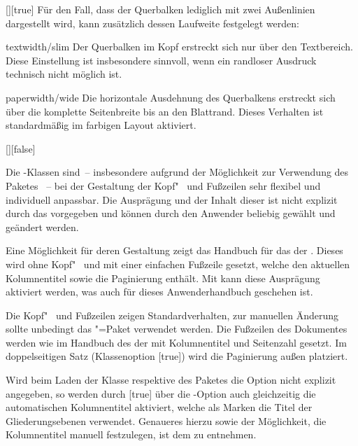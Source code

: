 \begin{Declaration*}{}
\begin{Declaration*}{}
\begin{Declaration*}{}
\begin{Declaration}{[\PSet]}[true]
%
Für den Fall, dass der Querbalken lediglich mit zwei Außenlinien dargestellt 
wird, kann zusätzlich dessen Laufweite festgelegt werden:
%
\begin{values}
\item[textwidth/slim]
  Der Querbalken im Kopf erstreckt sich nur über den Textbereich. Diese 
  Einstellung ist insbesondere sinnvoll, wenn ein randloser Ausdruck technisch 
  nicht möglich ist.   
\item[paperwidth/wide]
  Die horizontale Ausdehnung des Querbalkens erstreckt sich über die komplette 
  Seitenbreite bis an den Blattrand. Dieses Verhalten ist standardmäßig im 
  farbigen Layout aktiviert.
\end{values}
\end{Declaration}

\begin{Declaration}{[\PSet]}[false]%
\printdeclarationlist%
%
%
%

Die \TUDScript-Klassen sind~-- insbesondere aufgrund der Möglichkeit zur 
Verwendung des Paketes ~-- bei der Gestaltung der 
Kopf"~ und Fußzeilen sehr flexibel und individuell anpassbar. Die Ausprägung 
und der Inhalt dieser ist nicht explizit durch das \CD vorgegeben und können 
durch den Anwender beliebig gewählt und geändert werden. 

Eine Möglichkeit für deren Gestaltung zeigt das Handbuch für das \CD der \TnUD. 
Dieses wird ohne Kopf"~ und mit einer einfachen Fußzeile gesetzt, welche den 
aktuellen Kolumnentitel sowie die Paginierung enthält. Mit  kann 
diese Ausprägung aktiviert werden, was auch für dieses Anwenderhandbuch 
geschehen ist.
%
\begin{values}
\itemfalse
  Die Kopf"~ und Fußzeilen zeigen Standardverhalten, zur manuellen Änderung 
  sollte unbedingt das \KOMAScript"=Paket  verwendet 
  werden.
\itemtrue*
  Die Fußzeilen des Dokumentes werden wie im Handbuch des \CDs der \TnUD 
  mit Kolumnentitel und Seitenzahl gesetzt. Im doppelseitigen Satz 
  (Klassenoption [true]) wird die Paginierung außen platziert.
\end{values}
%
Wird beim Laden der Klasse respektive des Paketes  
die Option  nicht explizit angegeben, so werden durch 
[true] über die \KOMAScript-Option  auch 
gleichzeitig die automatischen Kolumnentitel aktiviert, welche als Marken die 
Titel der Gliederungsebenen verwendet. Genaueres hierzu sowie der Möglichkeit, 
die Kolumnentitel manuell festzulegen, ist dem \scrguide zu entnehmen.


\end{Declaration}
\end{Declaration*}
\end{Declaration*}
\end{Declaration*}
